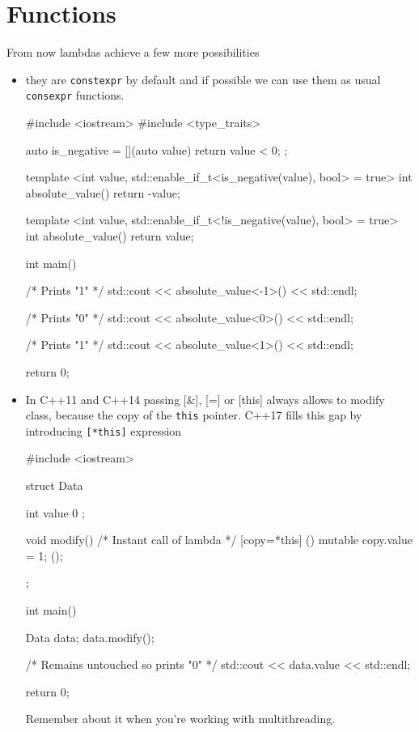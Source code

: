 \documentclass[../main]{subfiles}
\begin{document}
\section{Functions}
    From now lambdas achieve a few more possibilities
\begin{itemize}
    \item they are \texttt{constexpr} by default and if possible we can use them as usual \texttt{consexpr} functions.
    \begin{Code}
        #include <iostream>
        #include <type_traits>
        
        auto is_negative = [](auto value) { return value < 0; };
        
        template <int value,
                  std::enable_if_t<is_negative(value), bool> = true>
        int absolute_value()
        {
            return -value;
        }
        
        template <int value,
                  std::enable_if_t<!is_negative(value), bool> = true>
        int absolute_value()
        {
            return value;
        }
        
        int main()
        {
            /* Prints "1" */
            std::cout << absolute_value<-1>() << std::endl;

            /* Prints "0" */
            std::cout << absolute_value<0>() << std::endl;
            
            /* Prints "1" */
            std::cout << absolute_value<1>() << std::endl;
        
            return 0;
        }
        \end{Code}
    \item In C++11 and C++14 passing [\&], [=] or [this] always allows to modify class, because the copy of the \texttt{this} pointer. C++17 fills this gap
    by introducing \texttt{[*this]} expression
    \begin{Code}
        #include <iostream>

        struct Data
        {
            int value { 0 };
            
            void modify()
            {
                /* Instant call of lambda */
                [copy=*this] () mutable { copy.value = 1; } ();
            }
        };
        
        int main()
        {
            Data data;
            data.modify();
            
            /* Remains untouched so prints "0" */
            std::cout << data.value << std::endl;
        
            return 0;
        }
    \end{Code}
    \noindent
    Remember about it when you're working with multithreading.
\end{itemize}
\end{document}
